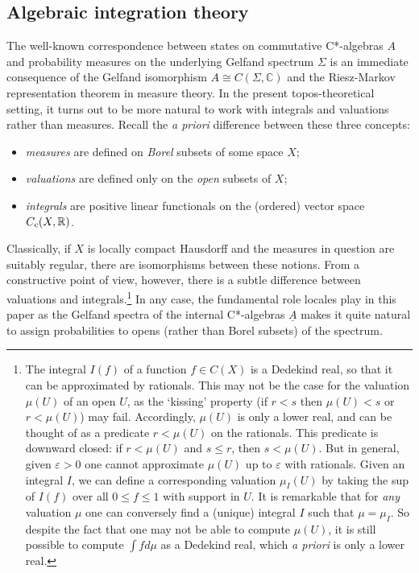 \documentclass[11pt]{article}
\newcommand{\ca}{C*-algebra} \newcommand{\jba}{JB-algebra}
\newcommand{\Sg}{\Sigma} \newcommand{\ta}{\tau} \newcommand{\ph}{\phi}
\newcommand{\C}{{\mathbb C}} \newcommand{\D}{{\mathbb D}}
\newcommand{\uA}{\underline{A}}
\begin{document}
\subsection{Algebraic integration theory}\label{ss:th-integrals}
The well-known correspondence between states on commutative \ca s $A$ and
probability measures
on the underlying Gelfand spectrum $\Sg$ is an immediate consequence of the
Gelfand isomorphism
$A\cong C(\Sg,\C)$ and the Riesz-Markov representation theorem in measure
theory.
In the present  topos-theoretical setting, it turns out to be more natural
to work with integrals and valuations rather than measures.
 Recall the {\it a priori} difference between these three concepts:
\begin{itemize}
\item {\it measures} are defined on {\it Borel} subsets of some space $X$;
\item  {\it valuations}  are
defined only on the {\it open} subsets of $X$;
\item  {\it integrals}
are positive linear functionals on the (ordered) vector space $C_c(X,{\mathbb R})$.
\end{itemize}
Classically, if $X$ is locally compact Hausdorff and the measures in
question are suitably regular, there are isomorphisms between these
notions. From a constructive point of view, however, there is a
subtle difference between valuations and integrals.\footnote{The
integral $I(f)$ of a function $f \in C(X)$ is a Dedekind real, so that
it can be approximated by rationals. This may not be the case for the
valuation $\mu (U)$ of an open $U$, as the `kissing' property
(if $r<s$ then $\mu (U) < s$ or $r<\mu (U)$) may fail. Accordingly,
$\mu (U)$ is only a lower real, and can be thought of as a
predicate $r < \mu (U)$ on the rationals. This predicate is downward
closed: if $r < \mu (U)$ and $s \leqslant r$, then $s < \mu (U)$. But in
general, given $\varepsilon > 0$ one cannot approximate $\mu(U)$ up to
$\varepsilon$ with rationals. Given an integral $I$, we can define a
corresponding valuation $\mu_I (U)$ by taking the sup of $I (f)$ over
all $0 \leqslant f \leqslant 1$ with support in $U$. It is remarkable that for
\textit{any} valuation $\mu$ one can
conversely find a (unique) integral $I$ such that $\mu = \mu_I$. So
despite the fact that one may not be able to compute $\mu (U)$, it is
still possible to compute $\int fd \mu$ as a Dedekind real, which \textit{a
priori} is only a lower real.}
In any case, the fundamental role  locales play in this paper as the
Gelfand spectra of the internal C*-algebras $\uA$ makes it quite
natural to assign probabilities to opens (rather than Borel subsets)
of the spectrum.
\end{document}
